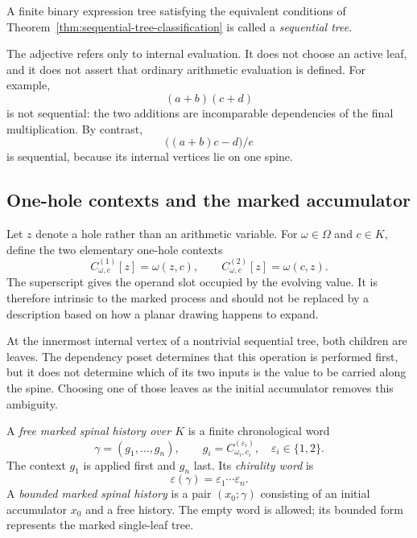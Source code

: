 \begin{definition}
\label{def:sequential-tree}
A finite binary expression tree satisfying the equivalent conditions of
Theorem~\ref{thm:sequential-tree-classification} is called a
\emph{sequential tree}.
\end{definition}

The adjective refers only to internal evaluation.  It does not choose an
active leaf, and it does not assert that ordinary arithmetic evaluation is
defined.  For example,
\[
  (a+b)(c+d)
\]
is not sequential: the two additions are incomparable dependencies of the
final multiplication.  By contrast,
\[
  \bigl((a+b)c-d\bigr)/e
\]
is sequential, because its internal vertices lie on one spine.

\subsection{One-hole contexts and the marked accumulator}

Let $z$ denote a hole rather than an arithmetic variable.  For
$\omega\in\Omega$ and $c\in K$, define the two elementary one-hole contexts
\begin{equation}
  C_{\omega,c}^{(1)}[z]=\omega(z,c),
  \qquad
  C_{\omega,c}^{(2)}[z]=\omega(c,z).
  \label{eq:elementary-one-hole-contexts}
\end{equation}
The superscript gives the operand slot occupied by the evolving value.  It is
therefore intrinsic to the marked process and should not be replaced by a
description based on how a planar drawing happens to expand.

At the innermost internal vertex of a nontrivial sequential tree, both children
are leaves.  The dependency poset determines that this operation is performed
first, but it does not determine which of its two inputs is the value to be
carried along the spine.  Choosing one of those leaves as the initial
accumulator removes this ambiguity.

\begin{definition}
\label{def:marked-spinal-history}
A \emph{free marked spinal history over $K$} is a finite chronological word
\[
  \gamma=(g_1,\ldots,g_n),
  \qquad
  g_i=C_{\omega_i,c_i}^{(\varepsilon_i)},
  \quad \varepsilon_i\in\{1,2\}.
\]
The context $g_1$ is applied first and $g_n$ last.  Its \emph{chirality word}
is
\[
  \varepsilon(\gamma)=\varepsilon_1\cdots\varepsilon_n.
\]
A \emph{bounded marked spinal history} is a pair $(x_0;\gamma)$ consisting of
an initial accumulator $x_0$ and a free history.  The empty word is allowed;
its bounded form represents the marked single-leaf tree.
\end{definition}

